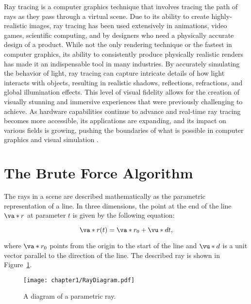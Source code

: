 \par Ray tracing is a computer graphics technique that involves tracing the path of rays as they pass through a virtual scene. Due to its ability to create highly-realistic images, ray tracing has been used extensively in animations, video games, scientific computing, and by designers who need a physically accurate design of a product. While not the only rendering technique or the fastest in computer graphics, its ability to consistently produce physically realistic renders has made it an indispensable tool in many industries. By accurately simulating the behavior of light, ray tracing can capture intricate details of how light interacts with objects, resulting in realistic shadows, reflections, refractions, and global illumination effects. This level of visual fidelity allows for the creation of visually stunning and immersive experiences that were previously challenging to achieve. As hardware capabilities continue to advance and real-time ray tracing becomes more accessible, its applications are expanding, and its impact on various fields is growing, pushing the boundaries of what is possible in computer graphics and visual simulation \cite{Peddie}.

\section{The Brute Force Algorithm}
The rays in a scene are described mathematically as the parametric representation of a line. In three dimensions, the point at the end of the line $\va*{r}$ at parameter $t$ is given by the following equation:

\begin{equation}
\va*{r}(t) = \va*{r_0} + \vu*{d} t,
\label{eq:parametric_ray}
\end{equation}

\noindent where $\va*{r_0}$ points from the origin to the start of the line and $\vu*{d}$ is a unit vector parallel to the direction of the line. The described ray is shown in Figure~\ref{fig:ray_diagram}.\\

\begin{figure}[H]
    \centering
	\texttt{[image: chapter1/RayDiagram.pdf]}
	\caption{A diagram of a parametric ray.}
	\label{fig:ray_diagram}
\end{figure}

